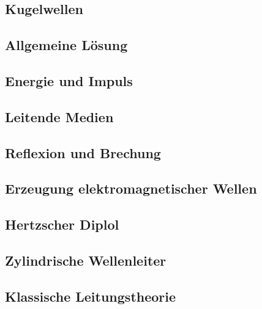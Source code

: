 \subsection{Kugelwellen}

\subsection{Allgemeine Lösung}

\subsection{Energie und Impuls}

\subsection{Leitende Medien}

\subsection{Reflexion und Brechung}

\subsection{Erzeugung elektromagnetischer Wellen}

\subsection{Hertzscher Diplol}

\subsection{Zylindrische Wellenleiter}

\subsection{Klassische Leitungstheorie}


